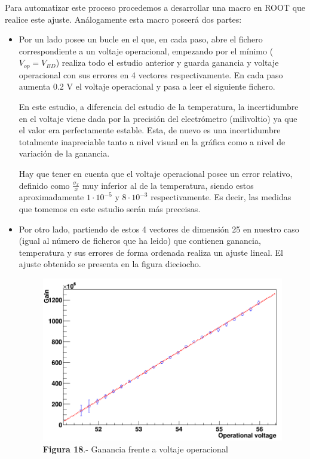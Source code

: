 Para automatizar este proceso procedemos a desarrollar una macro en ROOT que realice este ajuste. Análogamente esta macro poseerá dos partes:
\begin{itemize}
\item{} Por un lado posee un bucle en el que, en cada paso, abre el fichero correspondiente a un voltaje operacional, empezando por el mínimo ($V_{op}=V_{BD}$) realiza todo el estudio anterior y guarda ganancia y voltaje operacional con sus errores en 4 vectores respectivamente. En cada paso aumenta 0.2 V el voltaje operacional y pasa a leer el siguiente fichero. 

En este estudio, a diferencia del estudio de la temperatura, la incertidumbre en el voltaje viene dada por la precisión del electrómetro (milivoltio) ya que el valor era perfectamente estable. Esta, de nuevo es una incertidumbre totalmente inapreciable tanto a nivel visual en la gráfica como a nivel de variación de la ganancia. 

Hay que tener en cuenta que el voltaje operacional posee un error relativo, definido como $\frac{\sigma_x}{x}$ muy inferior al de la temperatura, siendo estos aproximadamente $1 \cdot 10^{-5}$ y $8 \cdot 10^{-3}$ respectivamente. Es decir, las medidas que tomemos en este estudio serán más preceisas.

\item {} Por otro lado, partiendo de estos 4 vectores de dimensión 25 en nuestro caso (igual al número de ficheros que ha leido) que contienen ganancia, temperatura y sus errores de forma ordenada realiza un ajuste lineal. El ajuste obtenido se presenta en la figura dieciocho.

\begin{figure}[hbtp]
\centering
\includegraphics[scale=0.4]{Dependenciavoltaje.png}
\caption{\textbf{Figura 18}.- Ganancia frente a voltaje operacional}
\end{figure}


\end{itemize}
